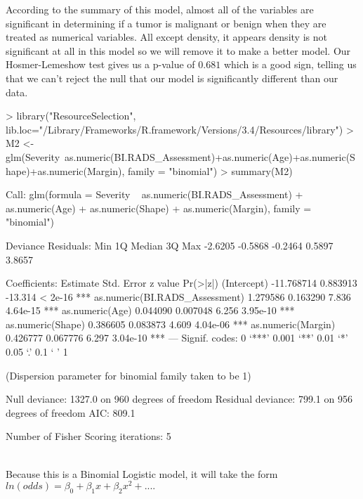 \documentclass{article}
\begin{document}
According to the summary of this model, almost all of the variables are significant in determining if a tumor is malignant or benign when they are treated as numerical variables. All except density, it appears density is not significant at all in this model so we will remove it to make a better model. Our Hosmer-Lemeshow test gives us a p-value of $0.681$ which is a good sign, telling us that we can't reject the null that our model is significantly different than our data.\\



\begin{Schunk}
\begin{Sinput}
> library("ResourceSelection", lib.loc="/Library/Frameworks/R.framework/Versions/3.4/Resources/library")
> M2 <- glm(Severity~as.numeric(BI.RADS_Assessment)+as.numeric(Age)+as.numeric(Shape)+as.numeric(Margin), family = "binomial")
> summary(M2)
\end{Sinput}
\begin{Soutput}
Call:
glm(formula = Severity ~ as.numeric(BI.RADS_Assessment) + as.numeric(Age) + 
    as.numeric(Shape) + as.numeric(Margin), family = "binomial")

Deviance Residuals: 
    Min       1Q   Median       3Q      Max  
-2.6205  -0.5868  -0.2464   0.5897   3.8657  

Coefficients:
                                 Estimate Std. Error z value Pr(>|z|)    
(Intercept)                    -11.768714   0.883913 -13.314  < 2e-16 ***
as.numeric(BI.RADS_Assessment)   1.279586   0.163290   7.836 4.64e-15 ***
as.numeric(Age)                  0.044090   0.007048   6.256 3.95e-10 ***
as.numeric(Shape)                0.386605   0.083873   4.609 4.04e-06 ***
as.numeric(Margin)               0.426777   0.067776   6.297 3.04e-10 ***
---
Signif. codes:  0 ‘***’ 0.001 ‘**’ 0.01 ‘*’ 0.05 ‘.’ 0.1 ‘ ’ 1

(Dispersion parameter for binomial family taken to be 1)

    Null deviance: 1327.0  on 960  degrees of freedom
Residual deviance:  799.1  on 956  degrees of freedom
AIC: 809.1

Number of Fisher Scoring iterations: 5
\end{Soutput}
\end{Schunk}
\hfill \\
Because this is a Binomial Logistic model, it will take the form $ln(odds) = \beta_{0}+\beta_{1}x+\beta_{2}x^{2}+....$ \\
\end{document}
